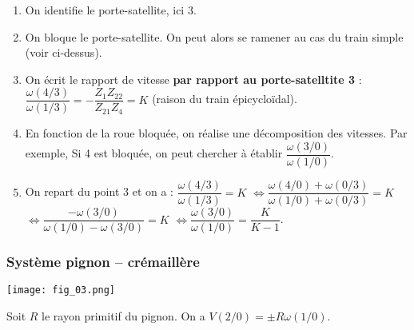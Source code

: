 \begin{methode}
\begin{enumerate}
\item On identifie le porte-satellite, ici 3.
\item On bloque le porte-satellite. On peut alors se ramener au cas du train simple (voir ci-dessus). 
\item On écrit le rapport de vitesse \textbf{par rapport au porte-satelltite 3} :$
\dfrac{\omega(4/3)}{\omega(1/3)}=-\dfrac{Z_1Z_{22}}{Z_{21}Z_4} = K
$ (raison du train épicycloïdal).
\item En fonction de la roue bloquée, on réalise une décomposition des vitesses. Par exemple, Si 4 est bloquée, on   peut chercher à établir $\dfrac{\omega(3/0)}{\omega(1/0)}$. 
\item On repart du point 3 et on a : $\dfrac{\omega(4/3)}{\omega(1/3)}= K$
$\Leftrightarrow \dfrac{\omega(4/0)+\omega(0/3)}{\omega(1/0)+\omega(0/3)}= K$
$\Leftrightarrow \dfrac{-\omega(3/0)}{\omega(1/0)-\omega(3/0)}= K$
$\Leftrightarrow \dfrac{\omega(3/0)}{\omega(1/0)} = \dfrac{K}{K-1}$.
\end{enumerate}
\end{methode}
%
\subsubsection{Système pignon -- crémaillère}

\begin{marginfigure}
\texttt{[image: fig\_03.png]}
\end{marginfigure}

\begin{resultat}
Soit $R$ le rayon primitif du pignon. On a $V(2/0) = \pm R \omega(1/0)$.
\end{resultat}

